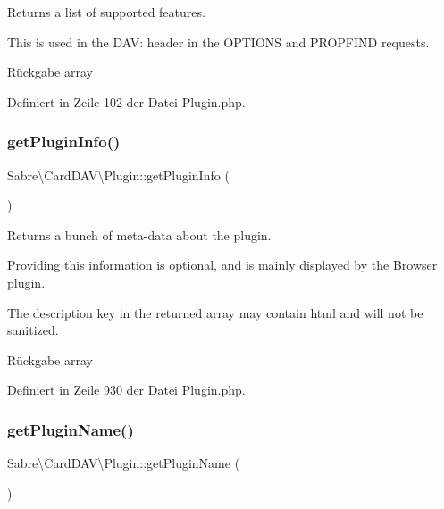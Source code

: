 Returns a list of supported features.

This is used in the D\+AV\+: header in the O\+P\+T\+I\+O\+NS and P\+R\+O\+P\+F\+I\+ND requests.

\begin{DoxyReturn}{Rückgabe}
array 
\end{DoxyReturn}


Definiert in Zeile 102 der Datei Plugin.\+php.

\mbox{\label{class_sabre_1_1_card_d_a_v_1_1_plugin_abebe74e2defb27bc62f859094fb7f93a}} 
\subsubsection{\texorpdfstring{get\+Plugin\+Info()}{getPluginInfo()}}
{\footnotesize\ttfamily Sabre\textbackslash{}\+Card\+D\+A\+V\textbackslash{}\+Plugin\+::get\+Plugin\+Info (\begin{DoxyParamCaption}{ }\end{DoxyParamCaption})}

Returns a bunch of meta-\/data about the plugin.

Providing this information is optional, and is mainly displayed by the Browser plugin.

The description key in the returned array may contain html and will not be sanitized.

\begin{DoxyReturn}{Rückgabe}
array 
\end{DoxyReturn}


Definiert in Zeile 930 der Datei Plugin.\+php.

\mbox{\label{class_sabre_1_1_card_d_a_v_1_1_plugin_a94a56e6c2a32374fee033475954b1402}} 
\subsubsection{\texorpdfstring{get\+Plugin\+Name()}{getPluginName()}}
{\footnotesize\ttfamily Sabre\textbackslash{}\+Card\+D\+A\+V\textbackslash{}\+Plugin\+::get\+Plugin\+Name (\begin{DoxyParamCaption}{ }\end{DoxyParamCaption})}

